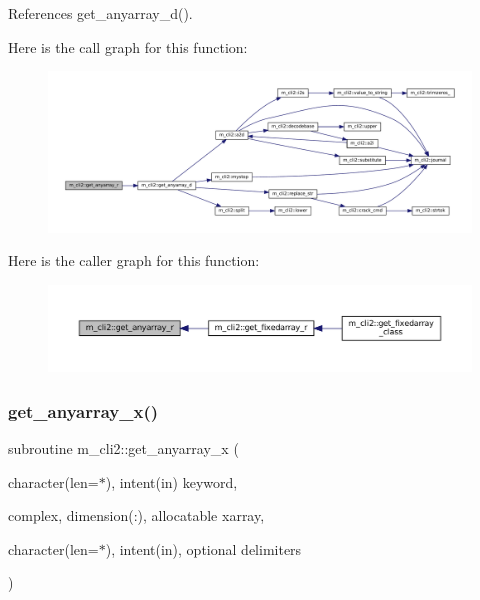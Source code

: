 References get\+\_\+anyarray\+\_\+d().

Here is the call graph for this function\+:
\nopagebreak
\begin{figure}[H]
\begin{center}
\leavevmode
\includegraphics[width=350pt]{namespacem__cli2_a8f1d5223b075f23d513c94548a1ebf09_cgraph}
\end{center}
\end{figure}
Here is the caller graph for this function\+:
\nopagebreak
\begin{figure}[H]
\begin{center}
\leavevmode
\includegraphics[width=350pt]{namespacem__cli2_a8f1d5223b075f23d513c94548a1ebf09_icgraph}
\end{center}
\end{figure}
\mbox{\label{namespacem__cli2_ab9ab288fa5f108beeb7c94d81b223b7c}} 
\subsubsection{\texorpdfstring{get\+\_\+anyarray\+\_\+x()}{get\_anyarray\_x()}}
{\footnotesize\ttfamily subroutine m\+\_\+cli2\+::get\+\_\+anyarray\+\_\+x (\begin{DoxyParamCaption}\item[{character(len=$\ast$), intent(in)}]{keyword,  }\item[{complex, dimension(\+:), allocatable}]{xarray,  }\item[{character(len=$\ast$), intent(in), optional}]{delimiters }\end{DoxyParamCaption})\hspace{0.3cm}{\ttfamily [private]}}



